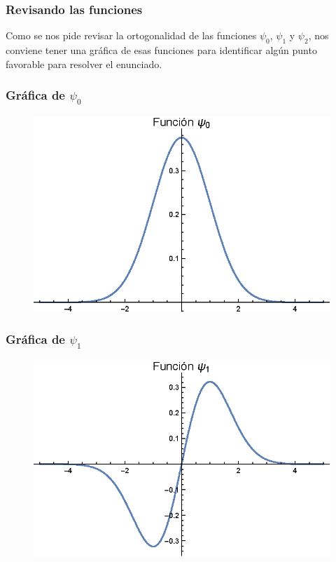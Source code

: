 \documentclass[12pt]{beamer}
\begin{document}
\begin{frame}
\frametitle{Revisando las funciones}
Como se nos pide revisar la ortogonalidad de las funciones $\psi_{0}$, $\psi_{1}$ y $\psi_{2}$, \pause nos conviene tener una gráfica de esas funciones para identificar algún punto favorable para resolver el enunciado.
\end{frame}
\begin{frame}
\frametitle{Gráfica de $\psi_{0}$}
\begin{figure}
  \centering
  \includegraphics[scale=1]{Imagenes/Plot_Hermite_Psi_0.eps}
\end{figure}
\end{frame}
\begin{frame}
\frametitle{Gráfica de $\psi_{1}$}
\begin{figure}
  \centering
  \includegraphics[scale=1]{Imagenes/Plot_Hermite_Psi_1.eps}
\end{figure}
\end{frame}
\end{document}
